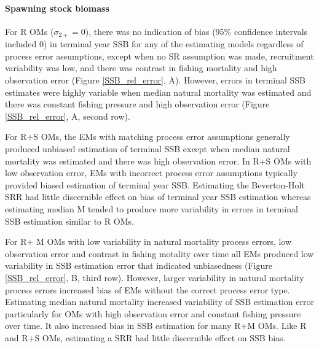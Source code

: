 \documentclass[
  12pt,
]{article}
\begin{document}
\paragraph*{Spawning stock biomass}\label{spawning-stock-biomass}

For R OMs (\(\sigma_{2+} = 0\)), there was no indication of bias (95\%
confidence intervals included 0) in terminal year SSB for any of the
estimating models regardless of process error assumptions, except when
no SR assumption was made, recruitment variability was low, and there
was contrast in fishing mortality and high observation error (Figure
\ref{SSB_rel_error}, A). However, errors in terminal SSB estimates were
highly variable when median natural mortality was estimated and there
was constant fishing pressure and high observation error (Figure
\ref{SSB_rel_error}, A, second row).

For R+S OMs, the EMs with matching process error assumptions generally
produced unbiased estimation of terminal SSB except when median natural
mortality was estimated and there was high observation error. In R+S OMs
with low observation error, EMs with incorrect process error assumptions
typically provided biased estimation of terminal year SSB. Estimating
the Beverton-Holt SRR had little discernible effect on bias of terminal
year SSB estimation whereas estimating median M tended to produce more
variability in errors in terminal SSB estimation similar to R OMs.

For R+ M OMs with low variability in natural mortality process errors,
low observation error and contrast in fishing motality over time all EMs
produced low variability in SSB estimation error that indicated
unbiasedness (Figure \ref{SSB_rel_error}, B, third row). However, larger
variability in natural mortality process errors increased bias of EMs
without the correct process error type. Estimating median natural
mortality increased variability of SSB estimation error particularly for
OMs with high observation error and constant fishing pressure over time.
It also increased bias in SSB estimation for many R+M OMs. Like R and
R+S OMs, estimating a SRR had little discernible effect on SSB bias.
\end{document}

